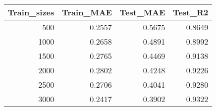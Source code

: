 \begin{tabular}{rrrr}
\toprule
Train_sizes & Train_MAE & Test_MAE & Test_R2 \\
\midrule
500 & 0.2557 & 0.5675 & 0.8649 \\
1000 & 0.2658 & 0.4891 & 0.8992 \\
1500 & 0.2765 & 0.4469 & 0.9138 \\
2000 & 0.2802 & 0.4248 & 0.9226 \\
2500 & 0.2706 & 0.4041 & 0.9280 \\
3000 & 0.2417 & 0.3902 & 0.9322 \\
\bottomrule
\end{tabular}
